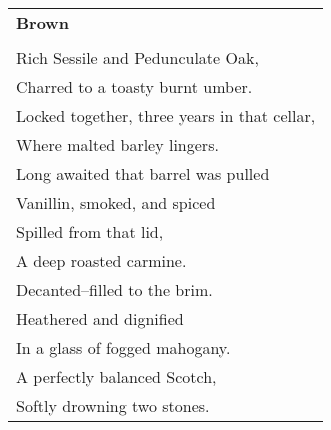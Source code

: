 \documentclass{article}
\begin{document}
\begin{center}
\begin{tabular}{l}
\textbf{Brown} \\
\\
Rich Sessile and Pedunculate Oak, \\
Charred to a toasty burnt umber. \\
Locked together, three years in that cellar, \\
Where malted barley lingers. \\
Long awaited that barrel was pulled \\
Vanillin, smoked, and spiced \\
Spilled from that lid, \\
A deep roasted carmine. \\
Decanted--filled to the brim. \\
Heathered and dignified \\
In a glass of fogged mahogany. \\
A perfectly balanced Scotch, \\
Softly drowning two stones. \\
\end{tabular}
\end{center}
\end{document}
